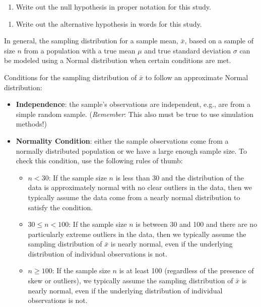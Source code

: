 \documentclass[
]{report}
\providecommand{\tightlist}{%
  \setlength{\itemsep}{0pt}\setlength{\parskip}{0pt}}
\begin{document}
\begin{enumerate}
\def\labelenumi{\arabic{enumi}.}
\tightlist
\item
  Write out the null hypothesis in proper notation for this study.
\end{enumerate}

\vspace{0.8in}

\begin{enumerate}
\def\labelenumi{\arabic{enumi}.}
\setcounter{enumi}{1}
\tightlist
\item
  Write out the alternative hypothesis in words for this study.
\end{enumerate}

\vspace{0.5in}

In general, the sampling distribution for a sample mean, \(\bar{x}\), based on a sample of size \(n\) from a population with a true mean \(\mu\) and true standard deviation \(\sigma\) can be modeled using a Normal distribution when certain conditions are met.

Conditions for the sampling distribution of \(\bar{x}\) to follow an approximate Normal distribution:

\begin{itemize}
\item
  \textbf{Independence}: the sample's observations are independent, e.g., are from a simple random sample. (\emph{Remember}: This also must be true to use simulation methods!)
\item
  \textbf{Normality Condition}: either the sample observations come from a normally distributed population or we have a large enough sample size. To check this condition, use the following rules of thumb:

  \begin{itemize}
  \item
    \(n < 30\): If the sample size \(n\) is less than 30 and the distribution of the data is approximately normal with no clear outliers in the data, then we typically assume the data come from a nearly normal distribution to satisfy the condition.
  \item
    \(30 \leq n < 100\): If the sample size \(n\) is between 30 and 100 and there are no particularly extreme outliers in the data, then we typically assume the sampling distribution of \(\bar{x}\) is nearly normal, even if the underlying distribution of individual observations is not.
  \item
    \(n \geq 100\): If the sample size \(n\) is at least 100 (regardless of the presence of skew or outliers), we typically assume the sampling distribution of \(\bar{x}\) is nearly normal, even if the underlying distribution of individual observations is not.
  \end{itemize}
\end{itemize}
\end{document}
